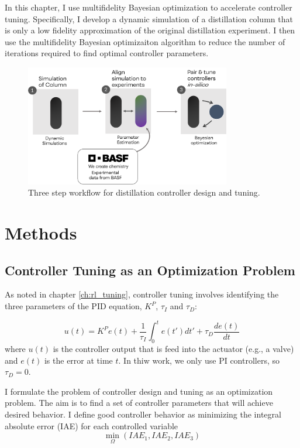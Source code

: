 In this chapter, I use multifidelity Bayesian optimization to accelerate controller tuning. Specifically, I develop a dynamic simulation of a distillation column that is only a low fidelity approximation of the original distillation experiment. I then use the multifidelity Bayesian optimizaiton algorithm to reduce the number of iterations required to find optimal controller parameters. 

\begin{figure}
    \centering
    \includegraphics[width=0.8\textwidth]{gfx/Chapter06/tuning_workflow.png}
    \caption{Three step workflow for distillation controller design and tuning. }
    \label{fig:tuning_workflow}
\end{figure}

\section{Methods}

\subsection{Controller Tuning as an Optimization Problem}

As noted in chapter \ref{ch:rl_tuning}, controller tuning involves identifying the three parameters of the PID equation, $K^P$, $\tau_I$ and $\tau_D$:

\begin{equation}
    u(t) = K^P e(t) + \frac{1}{\tau_I}\int_0^t e(t')dt' + \tau_D \frac{de(t)}{dt}
\end{equation}
where $u(t)$ is the controller output that is feed into the actuator (e.g., a valve) and $e(t)$ is the error at time $t$. In thiw work, we only use PI controllers, so $\tau_D=0$.

I formulate the problem of controller design and tuning as an optimization problem. The aim is to find a set of controller parameters that will achieve desired behavior. I define good controller behavior as minimizing the integral absolute error (IAE) for each controlled variable
\begin{equation}
    \min_{\Omega}(IAE_1, IAE_2, IAE_3)
\end{equation}



